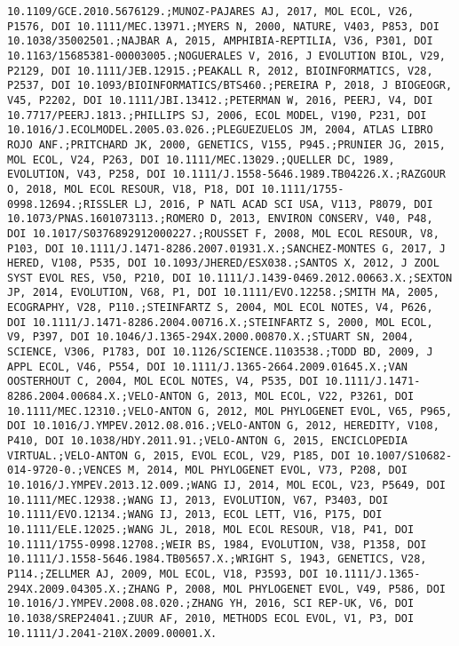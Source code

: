 \documentclass[]{article}
\begin{document}
\begin{verbatim}
10.1109/GCE.2010.5676129.;MUNOZ-PAJARES AJ, 2017, MOL ECOL, V26, P1576, DOI 10.1111/MEC.13971.;MYERS N, 2000, NATURE, V403, P853, DOI 10.1038/35002501.;NAJBAR A, 2015, AMPHIBIA-REPTILIA, V36, P301, DOI 10.1163/15685381-00003005.;NOGUERALES V, 2016, J EVOLUTION BIOL, V29, P2129, DOI 10.1111/JEB.12915.;PEAKALL R, 2012, BIOINFORMATICS, V28, P2537, DOI 10.1093/BIOINFORMATICS/BTS460.;PEREIRA P, 2018, J BIOGEOGR, V45, P2202, DOI 10.1111/JBI.13412.;PETERMAN W, 2016, PEERJ, V4, DOI 10.7717/PEERJ.1813.;PHILLIPS SJ, 2006, ECOL MODEL, V190, P231, DOI 10.1016/J.ECOLMODEL.2005.03.026.;PLEGUEZUELOS JM, 2004, ATLAS LIBRO ROJO ANF.;PRITCHARD JK, 2000, GENETICS, V155, P945.;PRUNIER JG, 2015, MOL ECOL, V24, P263, DOI 10.1111/MEC.13029.;QUELLER DC, 1989, EVOLUTION, V43, P258, DOI 10.1111/J.1558-5646.1989.TB04226.X.;RAZGOUR O, 2018, MOL ECOL RESOUR, V18, P18, DOI 10.1111/1755-0998.12694.;RISSLER LJ, 2016, P NATL ACAD SCI USA, V113, P8079, DOI 10.1073/PNAS.1601073113.;ROMERO D, 2013, ENVIRON CONSERV, V40, P48, DOI 10.1017/S0376892912000227.;ROUSSET F, 2008, MOL ECOL RESOUR, V8, P103, DOI 10.1111/J.1471-8286.2007.01931.X.;SANCHEZ-MONTES G, 2017, J HERED, V108, P535, DOI 10.1093/JHERED/ESX038.;SANTOS X, 2012, J ZOOL SYST EVOL RES, V50, P210, DOI 10.1111/J.1439-0469.2012.00663.X.;SEXTON JP, 2014, EVOLUTION, V68, P1, DOI 10.1111/EVO.12258.;SMITH MA, 2005, ECOGRAPHY, V28, P110.;STEINFARTZ S, 2004, MOL ECOL NOTES, V4, P626, DOI 10.1111/J.1471-8286.2004.00716.X.;STEINFARTZ S, 2000, MOL ECOL, V9, P397, DOI 10.1046/J.1365-294X.2000.00870.X.;STUART SN, 2004, SCIENCE, V306, P1783, DOI 10.1126/SCIENCE.1103538.;TODD BD, 2009, J APPL ECOL, V46, P554, DOI 10.1111/J.1365-2664.2009.01645.X.;VAN OOSTERHOUT C, 2004, MOL ECOL NOTES, V4, P535, DOI 10.1111/J.1471-8286.2004.00684.X.;VELO-ANTON G, 2013, MOL ECOL, V22, P3261, DOI 10.1111/MEC.12310.;VELO-ANTON G, 2012, MOL PHYLOGENET EVOL, V65, P965, DOI 10.1016/J.YMPEV.2012.08.016.;VELO-ANTON G, 2012, HEREDITY, V108, P410, DOI 10.1038/HDY.2011.91.;VELO-ANTON G, 2015, ENCICLOPEDIA VIRTUAL.;VELO-ANTON G, 2015, EVOL ECOL, V29, P185, DOI 10.1007/S10682-014-9720-0.;VENCES M, 2014, MOL PHYLOGENET EVOL, V73, P208, DOI 10.1016/J.YMPEV.2013.12.009.;WANG IJ, 2014, MOL ECOL, V23, P5649, DOI 10.1111/MEC.12938.;WANG IJ, 2013, EVOLUTION, V67, P3403, DOI 10.1111/EVO.12134.;WANG IJ, 2013, ECOL LETT, V16, P175, DOI 10.1111/ELE.12025.;WANG JL, 2018, MOL ECOL RESOUR, V18, P41, DOI 10.1111/1755-0998.12708.;WEIR BS, 1984, EVOLUTION, V38, P1358, DOI 10.1111/J.1558-5646.1984.TB05657.X.;WRIGHT S, 1943, GENETICS, V28, P114.;ZELLMER AJ, 2009, MOL ECOL, V18, P3593, DOI 10.1111/J.1365-294X.2009.04305.X.;ZHANG P, 2008, MOL PHYLOGENET EVOL, V49, P586, DOI 10.1016/J.YMPEV.2008.08.020.;ZHANG YH, 2016, SCI REP-UK, V6, DOI 10.1038/SREP24041.;ZUUR AF, 2010, METHODS ECOL EVOL, V1, P3, DOI 10.1111/J.2041-210X.2009.00001.X.

\end{verbatim}
\end{document}
